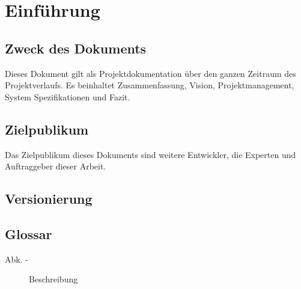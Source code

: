 \section{Einführung}
		\subsection{Zweck des Dokuments}
            Dieses Dokument gilt als Projektdokumentation über den ganzen Zeitraum des Projektverlaufs. Es beinhaltet Zusammenfassung, Vision, Projektmanagement, System Spezifikationen und Fazit.
		\subsection{Zielpublikum}
            Das Zielpublikum dieses Dokuments sind weitere Entwickler, die Experten und Auftraggeber dieser Arbeit.
		\subsection{Versionierung}
	    \gitversioning
        
        \clearpage
		\subsection{Glossar}
			\begin{description}
				\item[Abk. -] Beschreibung
			\end{description}